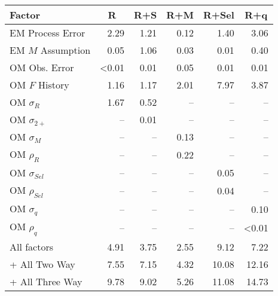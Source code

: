 \begin{center}
\begin{tabular}{lrrrrr}
\hline\hline
\multicolumn{1}{l}{Factor}&\multicolumn{1}{c}{R}&\multicolumn{1}{c}{R+S}&\multicolumn{1}{c}{R+M}&\multicolumn{1}{c}{R+Sel}&\multicolumn{1}{c}{R+q}\tabularnewline
\hline
EM Process Error& 2.29& 1.21& 0.12& 1.40& 3.06\tabularnewline
EM $M$ Assumption& 0.05& 1.06& 0.03& 0.01& 0.40\tabularnewline
OM Obs. Error&\textless  0.01& 0.01& 0.05& 0.01& 0.01\tabularnewline
OM $F$ History& 1.16& 1.17& 2.01& 7.97& 3.87\tabularnewline
OM $\sigma_R$& 1.67& 0.52&--&--&--\tabularnewline
OM $\sigma_{2+}$ &--& 0.01&--&--&--\tabularnewline
OM $\sigma_M$&--&--& 0.13&--&--\tabularnewline
OM $\rho_R$&--&--& 0.22&--&--\tabularnewline
OM $\sigma_{Sel}$&--&--&--& 0.05&--\tabularnewline
OM $\rho_{Sel}$&--&--&--& 0.04&--\tabularnewline
OM $\sigma_q$&--&--&--&--& 0.10\tabularnewline
OM $\rho_q$&--&--&--&--&\textless  0.01\tabularnewline
All factors& 4.91& 3.75& 2.55& 9.12& 7.22\tabularnewline
+ All Two Way& 7.55& 7.15& 4.32&10.08&12.16\tabularnewline
+ All Three Way& 9.78& 9.02& 5.26&11.08&14.73\tabularnewline
\hline
\end{tabular}\end{center}
